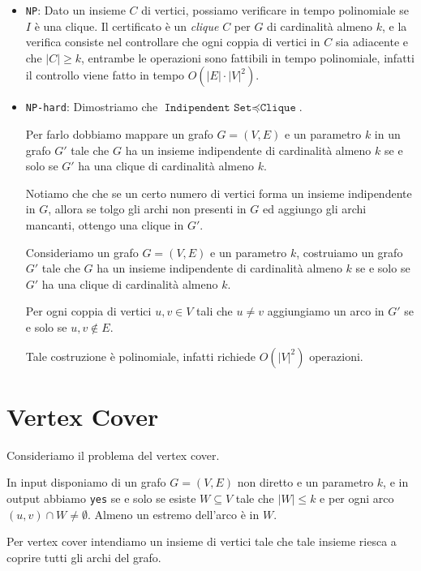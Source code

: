\begin{itemize}
    \item \texttt{NP}: Dato un insieme $C$ di vertici, possiamo verificare in tempo polinomiale
    se $I$ è una clique. Il certificato è un \textit{clique} $C$ per $G$ di cardinalità almeno $k$,
    e la verifica consiste nel controllare che ogni coppia di vertici in $C$ sia adiacente e che
    $|C| \geq k$, entrambe le operazioni sono fattibili in tempo polinomiale, infatti il controllo
    viene fatto in tempo $O(|E| \cdot |V|^2)$.
    \item \texttt{NP-hard}: Dimostriamo che $\texttt{Indipendent Set} \preceq \texttt{Clique}$.
    
    Per farlo dobbiamo mappare un grafo $G = (V,E)$ e un parametro $k$ in un grafo $G'$ tale che
    $G$ ha un insieme indipendente di cardinalità almeno $k$ se e solo se $G'$ ha una clique di
    cardinalità almeno $k$.

    Notiamo che che se un certo numero di vertici forma un insieme indipendente in $G$, allora
    se tolgo gli archi non presenti in $G$ ed aggiungo gli archi mancanti, ottengo una clique in $G'$.

    Consideriamo un grafo $G = (V,E)$ e un parametro $k$, costruiamo un grafo $G'$ tale che
    $G$ ha un insieme indipendente di cardinalità almeno $k$ se e solo se $G'$ ha una clique di
    cardinalità almeno $k$.

    Per ogni coppia di vertici $u,v \in V$ tali che $u \neq v$ aggiungiamo un arco in $G'$ se e solo
    se $u,v \notin E$.

    Tale costruzione è polinomiale, infatti richiede $O(|V|^2)$ operazioni.
\end{itemize}

\section{Vertex Cover}
Consideriamo il problema del vertex cover.

In input disponiamo di un grafo $G = (V,E)$ non diretto e un parametro $k$, e in output abbiamo
\texttt{yes} se e solo se esiste $W \subseteq V$ tale che $|W| \leq k$ e per ogni arco $(u,v) \cap W 
\neq \emptyset$. Almeno un estremo dell'arco è in $W$.

Per vertex cover intendiamo un insieme di vertici tale che tale insieme riesca a coprire tutti gli
archi del grafo.

